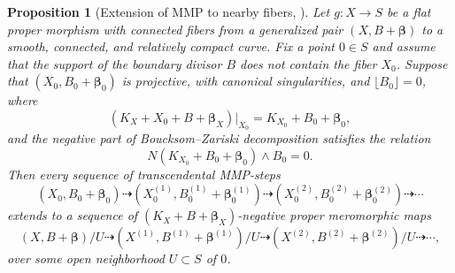 \documentclass[12pt]{amsart}
\numberwithin{equation}{section}
\newtheorem{proposition}[theorem]{Proposition}
\theoremstyle{definition}
\theoremstyle{plain}
\newtheorem*{thm A*}{Theorem A}
\newtheorem*{thm B*}{Theorem B}
\newtheorem*{thm C*}{Theorem C}
\newtheorem*{thm D*}{Theorem D}
\theoremstyle{definition}
\renewcommand{\1}{\mathds{1}}
\newcommand{\bbeta}{\boldsymbol{\beta}}
\renewcommand{\>}{\rightarrow}
\begin{document}
\begin{proposition}[{Extension of MMP to nearby fibers, \cite[Theorem 2]{DefGeneralType}}]\label{ExtendMMP}
Let $g: X \rightarrow S$ be a flat proper morphism with connected fibers from a generalized pair $(X,B+ \bbeta)$ to a smooth, connected, and relatively compact curve. Fix a point $0\in S$ and assume that the support of the boundary divisor $B$ does not contain the fiber $X_0$. Suppose that $(X_0,B_0 + { \boldsymbol{\beta}}_0)$ is projective, with canonical singularities, and $\lfloor B_0 \rfloor = 0$, where $$(K_X+X_0+B+\bbeta _X)|_{X_0}=K_{X_0}+B_0+\bbeta _0,$$ and the negative part of Boucksom--Zariski decomposition satisfies the relation $$N(K_{X_0}+ B_0 + \bbeta_0) \wedge B_0 = 0.$$ Then every sequence of transcendental MMP-steps \[(X_0, B_0  +\bbeta_0) \dashrightarrow (X_0^{(1)}, B_0^{(1) }+  \bbeta_0^{(1)}) \dashrightarrow (X_0^{(2)},B_0^{(2)}+ \bbeta_0^{(2)}) \dashrightarrow \cdots\]  extends to a sequence of $(K_X+B+\bbeta _X)$-negative proper meromorphic maps 
$$ (X, B+ \bbeta)/U \dashrightarrow (X^{(1)},B^{(1)}+ \bbeta^{(1)})/U \dashrightarrow (X^{(2)},B^{(2)}+ \bbeta^{(2)}) /U\dashrightarrow \cdots,$$over some open neighborhood $U\subset S$ of $0$.
\end{proposition}
\end{document}
